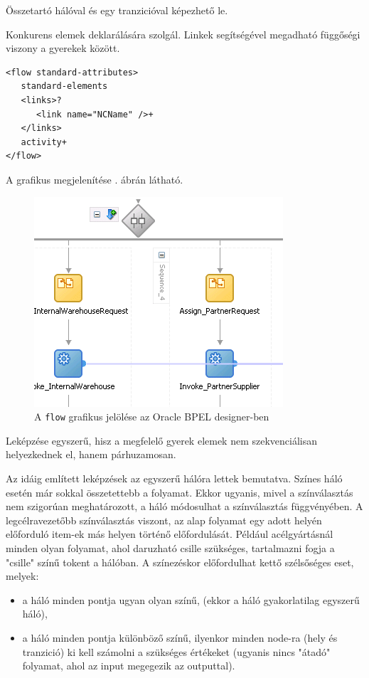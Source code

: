 Összetartó hálóval és egy tranzicióval képezhető le.



Konkurens elemek deklarálására szolgál. Linkek segítségével megadható függőségi viszony a gyerekek között. 
\begin{verbatim}
<flow standard-attributes>
   standard-elements
   <links>?
      <link name="NCName" />+
   </links>
   activity+
</flow>
\end{verbatim} 
A grafikus megjelenítése . ábrán látható.

\begin{figure}[h!]
\centering
\includegraphics[scale=1]{images/flow.png}
\caption{A \texttt{flow} grafikus jelölése az Oracle BPEL designer-ben}
\label{fig:flow}
\end{figure}
Leképzése egyszerű, hisz a megfelelő gyerek elemek nem szekvenciálisan helyezkednek el, hanem párhuzamosan.

Az idáig említett leképzések az egyszerű hálóra lettek bemutatva. Színes háló esetén már sokkal összetettebb a folyamat. Ekkor ugyanis, mivel a színválasztás nem szigorúan meghatározott, a háló módosulhat a színválasztás függvényében. A legcélravezetőbb színválasztás viszont, az alap folyamat egy adott helyén előforduló item-ek más helyen történő előfordulását. Például acélgyártásnál minden olyan folyamat, ahol daruzható csille szükséges, tartalmazni fogja a "csille" színű tokent a hálóban. A színezéskor előfordulhat kettő szélsőséges eset, melyek:
\begin{itemize}
\item a háló minden pontja ugyan olyan színű, (ekkor a háló gyakorlatilag egyszerű háló),
\item a háló minden pontja különböző színű, ilyenkor minden node-ra (hely és tranzició) ki kell számolni a szükséges értékeket (ugyanis nincs "átadó" folyamat, ahol az input megegezik az outputtal).
\end{itemize}



